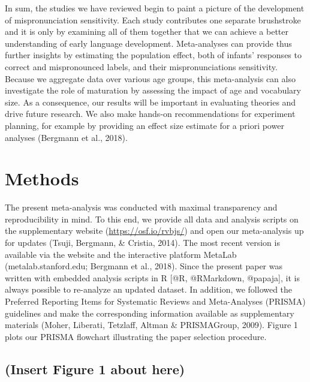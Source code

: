 \documentclass[man]{apa6}
\theoremstyle{definition}
\theoremstyle{definition}
\theoremstyle{definition}
\theoremstyle{remark}
\begin{document}
In sum, the studies we have reviewed begin to paint a picture of the
development of mispronunciation sensitivity. Each study contributes one
separate brushstroke and it is only by examining all of them together
that we can achieve a better understanding of early language
development. Meta-analyses can provide thus further insights by
estimating the population effect, both of infants' responses to correct
and mispronounced labels, and their mispronunciations sensitivity.
Because we aggregate data over various age groups, this meta-analysis
can also investigate the role of maturation by assessing the impact of
age and vocabulary size. As a consequence, our results will be important
in evaluating theories and drive future research. We also make hands-on
recommendations for experiment planning, for example by providing an
effect size estimate for a priori power analyses (Bergmann et al.,
2018).

\section{Methods}\label{methods}

The present meta-analysis was conducted with maximal transparency and
reproducibility in mind. To this end, we provide all data and analysis
scripts on the supplementary website (\url{https://osf.io/rvbjs/}) and
open our meta-analysis up for updates (Tsuji, Bergmann, \& Cristia,
2014). The most recent version is available via the website and the
interactive platform MetaLab (metalab.stanford.edu; Bergmann et al.,
2018). Since the present paper was written with embedded analysis
scripts in R {[}@R, @RMarkdown, @papaja{]}, it is always possible to
re-analyze an updated dataset. In addition, we followed the Preferred
Reporting Items for Systematic Reviews and Meta-Analyses (PRISMA)
guidelines and make the corresponding information available as
supplementary materials (Moher, Liberati, Tetzlaff, Altman \&
PRISMAGroup, 2009). Figure 1 plots our PRISMA flowchart illustrating the
paper selection procedure.

\subsection{(Insert Figure 1 about
here)}\label{insert-figure-1-about-here}
\end{document}
